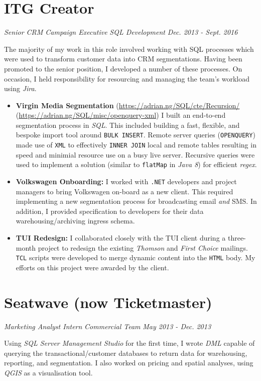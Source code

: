 \documentclass[letterpaper,11pt]{article}
\begin{document}
\section{ITG Creator}
\textit{Senior CRM Campaign Executive}
\hfill
\textit{SQL Development}
\hfill
\textit{Dec. 2013 - Sept. 2016\\}

\noindent
The majority of my work in this role involved working with SQL processes which were used to transform customer data into CRM segmentations. Having been promoted to the senior position, I developed a number of these processes. On occasion, I held responsibility for resourcing and managing the team's workload using \textit{Jira}.

\begin{itemize}
	\item
	      {
	      \textbf{Virgin Media Segmentation}
	      \hfill
	      \tiny
	      (\href{https://adrian.ng/SQL/cte/Recursion/}{https://adrian.ng/SQL/cte/Recursion/}
	      \quad
	      (\href{https://adrian.ng/SQL/misc/openquery-xml}{https://adrian.ng/SQL/misc/openquery-xml})
	      \newline
	      \small
	      I built an end-to-end segmentation process in \textit{SQL}. This included building a fast, flexible, and bespoke import tool around \texttt{BULK INSERT}. Remote server queries (\texttt{OPENQUERY}) made use of \texttt{XML} to effectively \texttt{INNER JOIN} local and remote tables resulting in speed and minimial resource use on a busy live server. Recursive queries were used to implement a solution (similar to \texttt{flatMap} in \textit{Java 8}) for efficient \textit{regex}.
	      }
	\item
	      {
	      \textbf{Volkswagen Onboarding:}
	      I worked with \texttt{.NET} developers and project managers to bring Volkswagen on-board as a new client. This required implementing a new segmentation process for broadcasting email \textit{and} SMS. In addition, I provided specification to developers for their data warehousing/archiving ingress schema.
	      }
	\item
	      {
	      \textbf{TUI Redesign:}
	      I collaborated closely with the TUI client during a three-month project to redesign the existing \textit{Thomson} and \textit{First Choice} mailings.	\texttt{TCL} scripts were developed to merge dynamic content into the \texttt{HTML} body. My efforts on this project were awarded by the client.
	      }
\end{itemize}
\section{Seatwave (now Ticketmaster)}
\textit{Marketing Analyst Intern}
\hfill
\textit{Commercial Team}
\hfill
\textit{May 2013 - Dec. 2013\\}

\noindent
Using \textit{SQL Server Management Studio} for the first time, I wrote \textit{DML} capable of querying the transactional/customer databases to return data for warehousing, reporting, and segmentation. I also worked on pricing and spatial analyses, using \textit{QGIS} as a visualisation tool.
\end{document}
